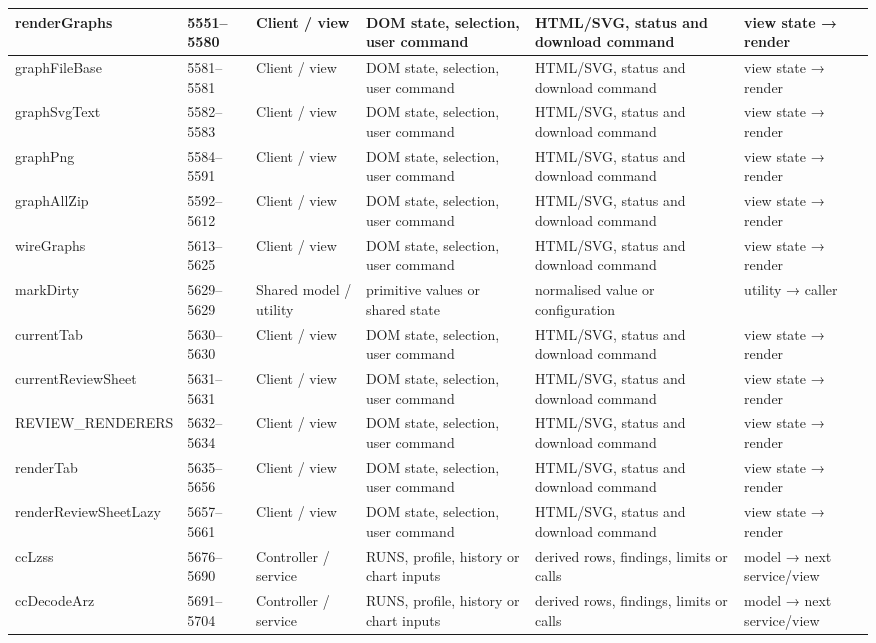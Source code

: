 \begin{landscape}
\begin{longtable}{@{}p{3.2cm}p{1.45cm}p{2.7cm}p{4.0cm}p{4.0cm}p{3.0cm}@{}}
renderGraphs & 5551--5580 & Client / view & DOM state, selection, user command & HTML/SVG, status and download command & view state → render \\\hline
graphFileBase & 5581--5581 & Client / view & DOM state, selection, user command & HTML/SVG, status and download command & view state → render \\\hline
graphSvgText & 5582--5583 & Client / view & DOM state, selection, user command & HTML/SVG, status and download command & view state → render \\\hline
graphPng & 5584--5591 & Client / view & DOM state, selection, user command & HTML/SVG, status and download command & view state → render \\\hline
graphAllZip & 5592--5612 & Client / view & DOM state, selection, user command & HTML/SVG, status and download command & view state → render \\\hline
wireGraphs & 5613--5625 & Client / view & DOM state, selection, user command & HTML/SVG, status and download command & view state → render \\\hline
markDirty & 5629--5629 & Shared model / utility & primitive values or shared state & normalised value or configuration & utility → caller \\\hline
currentTab & 5630--5630 & Client / view & DOM state, selection, user command & HTML/SVG, status and download command & view state → render \\\hline
currentReviewSheet & 5631--5631 & Client / view & DOM state, selection, user command & HTML/SVG, status and download command & view state → render \\\hline
REVIEW\_RENDERERS & 5632--5634 & Client / view & DOM state, selection, user command & HTML/SVG, status and download command & view state → render \\\hline
renderTab & 5635--5656 & Client / view & DOM state, selection, user command & HTML/SVG, status and download command & view state → render \\\hline
renderReviewSheetLazy & 5657--5661 & Client / view & DOM state, selection, user command & HTML/SVG, status and download command & view state → render \\\hline
ccLzss & 5676--5690 & Controller / service & RUNS, profile, history or chart inputs & derived rows, findings, limits or calls & model → next service/view \\\hline
ccDecodeArz & 5691--5704 & Controller / service & RUNS, profile, history or chart inputs & derived rows, findings, limits or calls & model → next service/view \\\hline

\end{longtable}
\end{landscape}
